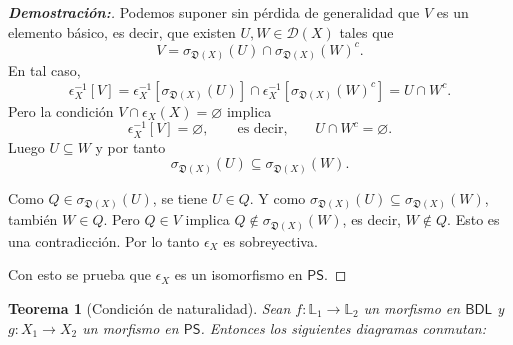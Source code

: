 \documentclass[12pt]{book}
\newtheorem{theorem}{Teorema}[section]
\newcommand{\D}{\mathfrak{D}}
\begin{document}
\begin{proof}[{\textbf{Demostración:}}]
Podemos suponer sin pérdida de generalidad que $V$ es un elemento básico,
es decir, que existen $U,W\in\mathcal{D}(X)$ tales que
\[
V=\sigma_{\D(X)}(U)\cap\sigma_{\D(X)}(W)^{c}.
\]
En tal caso,
\[
\epsilon_{X}^{-1}[V]
=\epsilon_{X}^{-1}[\sigma_{\D(X)}(U)]
  \cap \epsilon_{X}^{-1}[\sigma_{\D(X)}(W)^{c}]
=U\cap W^{c}.
\]
Pero la condición $V\cap\epsilon_{X}(X)=\varnothing$ implica
\[
\epsilon_{X}^{-1}[V]=\varnothing,
\qquad\text{es decir,}\qquad
U\cap W^{c}=\varnothing.
\]
Luego $U\subseteq W$ y por tanto
\[
\sigma_{\D(X)}(U)\subseteq\sigma_{\D(X)}(W).
\]

Como $Q\in\sigma_{\D(X)}(U)$, se tiene $U\in Q$.
Y como $\sigma_{\D(X)}(U)\subseteq\sigma_{\D(X)}(W)$, también
$W\in Q$.  
Pero $Q\in V$ implica $Q\notin\sigma_{\D(X)}(W)$, es decir,
$W\notin Q$.
Esto es una contradicción. Por lo tanto $\epsilon_{X}$ es sobreyectiva.


\noindent Con esto se prueba que $\epsilon_{X}$ es un isomorfismo en $\mathsf{PS}$.
\end{proof}

\medskip

\begin{theorem}[Condición de naturalidad]\label{thm:naturality} Sean 
\( f\colon \mathbb{L}_{1}\to\mathbb{L}_{2} \) un morfismo en \( \mathsf{BDL} \)
y 
\( g\colon X_{1}\to X_{2} \) un morfismo en \( \mathsf{PS} \).
Entonces los siguientes diagramas conmutan:
\end{theorem}
\end{document}
